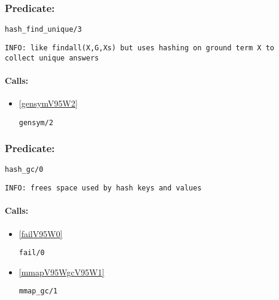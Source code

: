\subsubsection{Predicate:} \label{hashV95WfindV95WuniqueV95W3}

\begin{verbatim}
hash_find_unique/3
\end{verbatim}

{\small \begin{verbatim}
INFO: like findall(X,G,Xs) but uses hashing on ground term X to collect unique answers

\end{verbatim}}
\paragraph{Calls:} 
\begin{itemize}
\item \ref{gensymV95W2} 
\begin{verbatim}
gensym/2
\end{verbatim}

\end{itemize}

\subsubsection{Predicate:} \label{hashV95WgcV95W0}

\begin{verbatim}
hash_gc/0
\end{verbatim}

{\small \begin{verbatim}
INFO: frees space used by hash keys and values

\end{verbatim}}
\paragraph{Calls:} 
\begin{itemize}
\item \ref{failV95W0} 
\begin{verbatim}
fail/0
\end{verbatim}

\item \ref{mmapV95WgcV95W1} 
\begin{verbatim}
mmap_gc/1
\end{verbatim}

\end{itemize}

